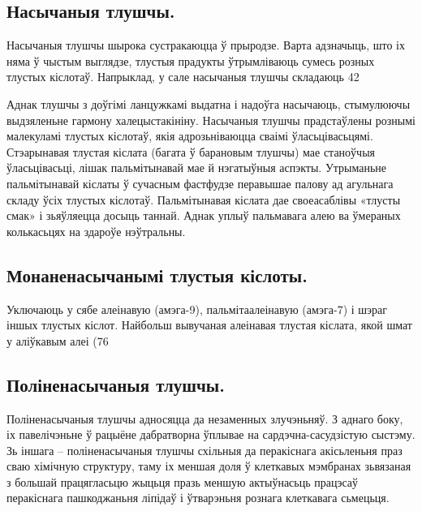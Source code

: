 \subsection{Насычаныя тлушчы.}
Насычаныя тлушчы шырока сустракаюцца ў прыродзе. Варта адзначыць, што іх няма ў чыстым выглядзе, тлустыя прадукты ўтрымліваюць сумесь розных тлустых кіслотаў. Напрыклад, у сале насычаныя тлушчы складаюць 42%

Аднак тлушчы з доўгімі ланцужкамі выдатна і надоўга насычаюць, стымулюючы выдзяленьне гармону халецыстакініну. Насычаныя тлушчы прадстаўлены рознымі малекуламі тлустых кіслотаў, якія адрозьніваюцца сваімі ўласьцівасьцямі. Стэарынавая тлустая кіслата (багата ў барановым тлушчы) мае станоўчыя ўласьцівасьці, лішак пальмітынавай мае й нэгатыўныя аспэкты. Утрыманьне пальмітынавай кіслаты ў сучасным фастфудзе перавышае палову ад агульнага складу ўсіх тлустых кіслотаў. Пальмітынавая кіслата дае своеасаблівы «тлусты смак» і зьяўляецца досыць таннай. Аднак уплыў пальмавага алею ва ўмераных колькасьцях на здароўе нэўтральны.

\subsection{Монаненасычанымі тлустыя кіслоты.}
Уключаюць у сябе алеінавую (амэга-9), пальмітаалеінавую (амэга-7) і шэраг іншых тлустых кіслот. Найбольш вывучаная алеінавая тлустая кіслата, якой шмат у аліўкавым алеі (76%

\subsection{Поліненасычаныя тлушчы.}
Поліненасычаныя тлушчы адносяцца да незаменных злучэньняў. З аднаго боку, іх павелічэньне ў рацыёне дабратворна ўплывае на сардэчна-сасудзістую сыстэму. Зь іншага – поліненасычаныя тлушчы схільныя да перакіснага акісьленьня праз сваю хімічную структуру, таму іх меншая доля ў клеткавых мэмбранах зьвязаная з большай працягласьцю жыцьця празь меншую актыўнасьць працэсаў перакіснага пашкоджаньня ліпідаў і ўтварэньня рознага клеткавага сьмецьця.


